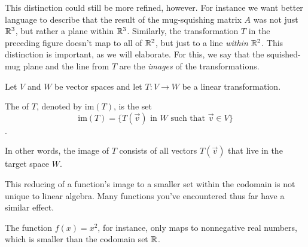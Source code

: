 \documentclass{ximera}
\begin{document}
This distinction could still be more refined, however. For instance we want better language to describe that the result of the mug-squishing matrix $A$ was not just $\mathbb{R}^3$, but rather a plane within $\mathbb{R}^3$. Similarly, the transformation $T$ in the preceding figure doesn't map to all of $\mathbb{R}^2$, but just to a line \emph{within} $\mathbb{R}^2$. This distinction is important, as we will elaborate. For this, we say that the squished-mug plane and the line from $T$ are the \emph{images} of the transformations.

\begin{definition}\label{def:imageofT}
Let $V$ and $W$ be vector spaces and let $T:V\rightarrow W$ be a linear transformation.  

The  of $T$, denoted by $\mbox{im}(T)$, is the set
$$\mbox{im}(T)=\{T(\vec{v})\text{ in }W\text{ such that }\vec{v}\in V\}$$.

In other words, the image of $T$ consists of all vectors $T(\vec{v})$ that live in the target space $W$.
\end{definition}

\begin{center}
\end{center}

\begin{remark}
  This reducing of a function's image to a smaller set within the codomain is not unique to linear algebra. Many functions you've encountered thus far have a similar effect. 

  The function $f(x)=x^2$, for instance, only maps to nonnegative real numbers, which is smaller than the codomain set $\mathbb{R}$.
\begin{center}
\end{center}
\end{remark}
 
\end{document}
